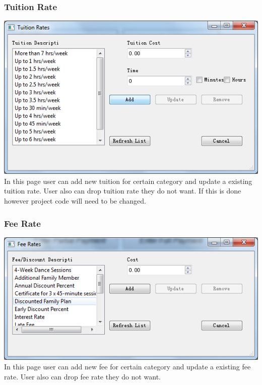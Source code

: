 \subsubsection{Tuition Rate}
\includegraphics[scale=0.5]{pics/Tuition_rate.png}\\
In this page user can add new tuition for certain category and update a existing tuition rate. User also can drop tuition rate they do not want. If this is done however project code will need to be changed.

\subsubsection{Fee Rate}
\includegraphics[scale=0.5]{pics/Fee_rate.png}\\
In this page user can add new fee for certain category and update a existing fee rate. User also can drop fee rate they do not want.

